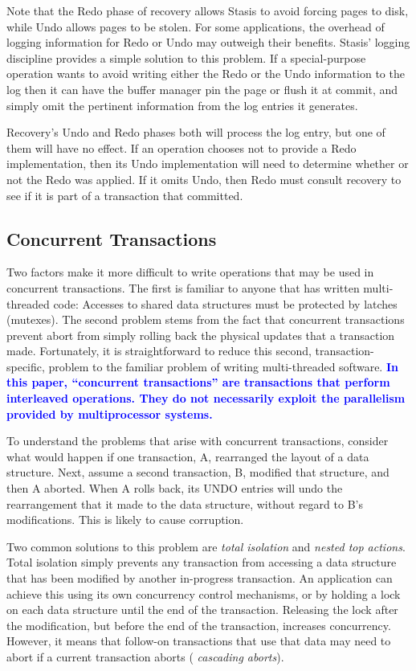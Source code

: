 \documentclass[letterpaper,twocolumn,10pt]{article}
\newcommand{\yad}{Stasis\xspace}
\newcommand{\yads}{Stasis'\xspace}
\newcommand{\diff}[1]{\textcolor{blue}{\bf #1}}
\begin{document}
Note that the Redo phase of recovery allows \yad to avoid forcing
pages to disk, while Undo allows pages to be stolen.  For some
applications, the overhead of logging information for Redo or Undo may
outweigh their benefits.  \yads logging discipline provides a simple
solution to this problem.  If a special-purpose operation wants to
avoid writing either the Redo or the Undo information to the log then
it can have the buffer manager pin the page or flush it at commit, and
simply omit the pertinent information from the log entries it
generates.

Recovery's Undo and Redo phases both will process the log entry, but
one of them will have no effect.  If an operation chooses not to
provide a Redo implementation, then its Undo implementation will need
to determine whether or not the Redo was applied.  If it omits Undo,
then Redo must consult recovery to see if it is part of a transaction that
committed.

\subsection{Concurrent Transactions}

Two factors make it more difficult to write operations that may be
used in concurrent transactions.  The first is familiar to anyone that
has written multi-threaded code: Accesses to shared data structures
must be protected by latches (mutexes).  The second problem stems from
the fact that concurrent transactions prevent abort from simply
rolling back the physical updates that a transaction made.
Fortunately, it is straightforward to reduce this second,
transaction-specific, problem to the familiar problem of writing
multi-threaded software.  \diff{In this paper, ``concurrent transactions''
are transactions that perform interleaved operations.  They do not
necessarily exploit the parallelism provided by multiprocessor
systems.}

To understand the problems that arise with concurrent transactions,
consider what would happen if one transaction, A, rearranged the
layout of a data structure.  Next, assume a second transaction, B,
modified that structure, and then A aborted.  When A rolls back, its
UNDO entries will undo the rearrangement that it made to the data
structure, without regard to B's modifications.  This is likely to
cause corruption.

Two common solutions to this problem are {\em total isolation} and
{\em nested top actions}.  Total isolation simply prevents any
transaction from accessing a data structure that has been modified by
another in-progress transaction.  An application can achieve this
using its own concurrency control mechanisms, or by holding a lock on
each data structure until the end of the transaction.  Releasing the
lock after the modification, but before the end of the transaction,
increases concurrency.  However, it means that follow-on transactions that use
that data may need to abort if a current transaction aborts ({\em
cascading aborts}).  %
\end{document}
